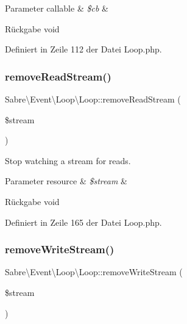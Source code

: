 \begin{DoxyParams}[1]{Parameter}
callable & {\em \$cb} & \\
\hline
\end{DoxyParams}
\begin{DoxyReturn}{Rückgabe}
void 
\end{DoxyReturn}


Definiert in Zeile 112 der Datei Loop.\+php.

\mbox{\label{class_sabre_1_1_event_1_1_loop_1_1_loop_a2eb117cbdc18fcdbbfe595bab3b24fc3}} 
\subsubsection{\texorpdfstring{remove\+Read\+Stream()}{removeReadStream()}}
{\footnotesize\ttfamily Sabre\textbackslash{}\+Event\textbackslash{}\+Loop\textbackslash{}\+Loop\+::remove\+Read\+Stream (\begin{DoxyParamCaption}\item[{}]{\$stream }\end{DoxyParamCaption})}

Stop watching a stream for reads.


\begin{DoxyParams}[1]{Parameter}
resource & {\em \$stream} & \\
\hline
\end{DoxyParams}
\begin{DoxyReturn}{Rückgabe}
void 
\end{DoxyReturn}


Definiert in Zeile 165 der Datei Loop.\+php.

\mbox{\label{class_sabre_1_1_event_1_1_loop_1_1_loop_a95eed71fade8365671ee032a6f70253a}} 
\subsubsection{\texorpdfstring{remove\+Write\+Stream()}{removeWriteStream()}}
{\footnotesize\ttfamily Sabre\textbackslash{}\+Event\textbackslash{}\+Loop\textbackslash{}\+Loop\+::remove\+Write\+Stream (\begin{DoxyParamCaption}\item[{}]{\$stream }\end{DoxyParamCaption})}


